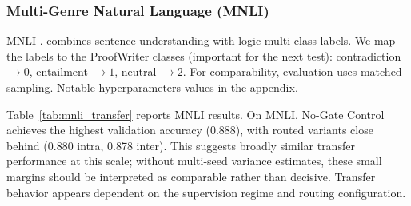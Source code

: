 \documentclass[10pt,twocolumn,letterpaper]{article}
\begin{document}
\begin{table}[htbp]
\caption{Trainable parameter counts for variants, inter/intra has no effect.}
\label{tab:param_counts}
\end{table}

\subsubsection{Multi-Genre Natural Language (MNLI)}
MNLI \cite{N18-1101}. combines sentence understanding with logic multi-class labels.
We map the labels to the ProofWriter classes (important for the next test):
contradiction $\rightarrow 0$, entailment $\rightarrow 1$, neutral $\rightarrow 2$.
For comparability, evaluation uses matched sampling. Notable hyperparameters
values in the appendix.

\begin{table}[htbp]
\centering
{}
\caption{Performance on MNLI.}
\label{tab:mnli_transfer}
\end{table}

Table~\ref{tab:mnli_transfer} reports MNLI results. On MNLI,
No-Gate Control achieves the highest validation accuracy
(0.888), with routed variants close behind (0.880 intra, 0.878 inter). This
suggests broadly similar transfer performance at this scale; without
multi-seed variance estimates, these small margins should be interpreted as
comparable rather than decisive. Transfer behavior appears dependent on the
supervision regime and routing configuration.
\end{document}
